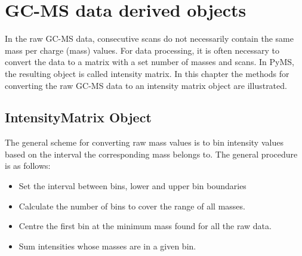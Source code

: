 

\chapter{GC-MS data derived objects}

In the raw GC-MS data, consecutive scans do not necessarily contain the same
mass per charge (mass) values. For data processing, it is often necessary to
convert the data to a matrix with a set number of masses and scans. In PyMS,
the resulting object is called intensity matrix. In this chapter the methods
for converting the raw GC-MS data to an intensity matrix object are illustrated.

\section{\label{sec:intensity-matrix}IntensityMatrix Object}
The general scheme for converting raw mass values is to bin intensity values
based on the interval the corresponding mass belongs to. The general procedure
is as follows:
\begin{itemize}
    \item Set the interval between bins, lower and upper bin boundaries
    \item Calculate the number of bins to cover the range of all masses.
    \item Centre the first bin at the minimum mass found for all the raw data.
    \item Sum intensities whose masses are in a given bin.
\end{itemize}

